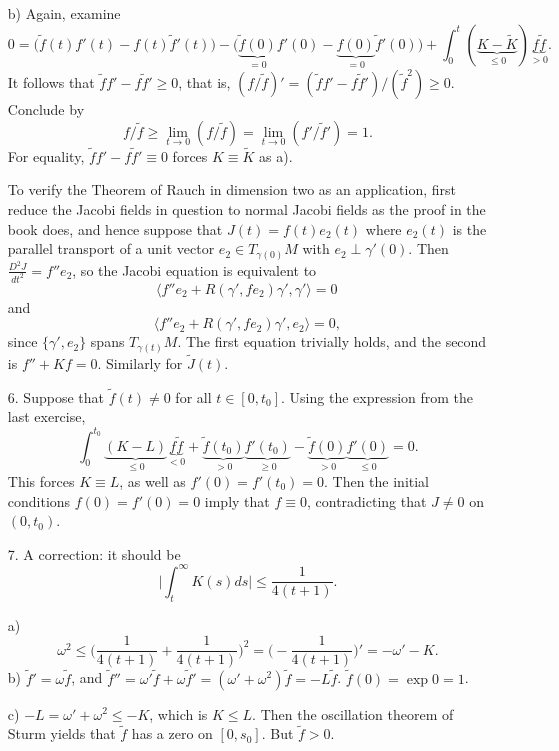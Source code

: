 \begin{itemize}
    b) Again, examine
    \[0=\big(\tilde{f}(t)f'(t)-f(t)\tilde{f}'(t)\big)
    -\big(\underbrace{\tilde{f}(0)}_{=0}f'(0)
    -\underbrace{f(0)}_{=0}\tilde{f}'(0)\big)
    +\int_0^t(\underbrace{K-\tilde{K}}_{\le0})\underbrace{f\tilde{f}}_{>0}.\]
    It follows that $\tilde{f}f'-f\tilde{f}'\ge0$, that is, 
    $(f/\tilde{f})'=(\tilde{f}f'-f\tilde{f}')/(\tilde{f}^2)\ge0$. 
    Conclude by
    \[f/\tilde{f}\ge\lim_{t\to0}(f/\tilde{f})=\lim_{t\to0}(f'/\tilde{f}')=1.\]
    For equality, $\tilde{f}f'-f\tilde{f}'\equiv0$ 
    forces $K\equiv\tilde{K}$ as a).
    
    To verify the Theorem of Rauch in dimension two as an application, 
    first reduce the Jacobi fields in question to normal Jacobi fields 
    as the proof in the book does, and hence suppose that $J(t)=f(t)e_2(t)$ 
    where $e_2(t)$ is the parallel transport of a unit vector 
    $e_2\in T_{\gamma(0)}M$ with $e_2\perp\gamma'(0)$. 
    Then $\frac{D^2J}{dt^2}=f''e_2$, 
    so the Jacobi equation is equivalent to 
    \[\langle f''e_2+R(\gamma',fe_2)\gamma',\gamma'\rangle=0\,\]
    and
    \[\langle f''e_2+R(\gamma',fe_2)\gamma',e_2\rangle=0,\]
    since $\{\gamma',e_2\}$ spans $T_{\gamma(t)}M$. 
    The first equation trivially holds, 
    and the second is $f''+Kf=0$. Similarly for $\tilde{J}(t)$.

    \item[6.] Suppose that $\tilde{f}(t)\ne0$ for all $t\in[0,t_0]$. 
    Using the expression from the last exercise,
    \[\int_0^{t_0}\underbrace{(K-L)}_{\le0}\underbrace{f\tilde{f}}_{<0}
    +\underbrace{\tilde{f}(t_0)}_{>0}\underbrace{f'(t_0)}_{\ge0}
    -\underbrace{\tilde{f}(0)}_{>0}\underbrace{f'(0)}_{\le0}=0.\]
    This forces $K\equiv L$, as well as $f'(0)=f'(t_0)=0$. 
    Then the initial conditions $f(0)=f'(0)=0$ 
    imply that $f\equiv0$, contradicting that $J\ne0$ on $(0,t_0)$.

    \item[7.] A correction: it should be
    \[\bigg|\int_t^\infty K(s)ds\bigg|\le\frac{1}{4(t+1)}.\]

    a) \[\omega^2\le\bigg(\frac{1}{4(t+1)}+\frac{1}{4(t+1)}\bigg)^2
    =\bigg(-\frac{1}{4(t+1)}\bigg)'=-\omega'-K.\]
    b) $\tilde{f}'=\omega\tilde{f}$, and $\tilde{f}''
    =\omega'\tilde{f}+\omega\tilde{f}'=(\omega'+\omega^2)\tilde{f}=-L\tilde{f}$. 
    $\tilde{f}(0)=\exp0=1$.

    c) $-L=\omega'+\omega^2\le-K$, which is $K\le L$. 
    Then the oscillation theorem of Sturm yields that 
    $\tilde{f}$ has a zero on $[0,s_0]$. But $\tilde{f}>0$.
\end{itemize}

